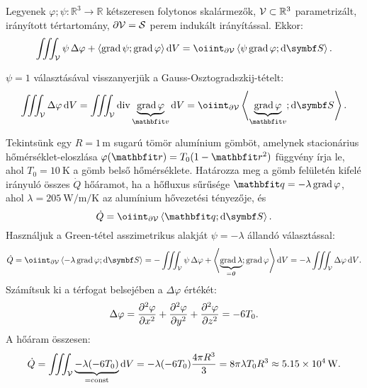 \documentclass{szb-practice}
\begin{document}
\begin{theorem}
  Legyenek $\varphi; \psi: \mathbb R^3 \rightarrow \mathbb R$ kétszeresen
  folytonos skalármezők, $\mathcal{V} \subset \mathbb R^3$ parametrizált,
  irányított tértartomány, $\partial \mathcal{V} = \mathcal{S}$ perem indukált
  irányítással. Ekkor:
  $$
    \iiint_{\volimage}
    \psi \, \Delta \varphi +
    \scalar{\grad \psi}{\grad \varphi}
    \dd \volscalar
    =
    \oiint_{\partial \volimage} \scalar{\psi \grad \varphi}{\dd \surfvec}
    \text.
  $$
\end{theorem}

\begin{note}
  $\psi = 1$ választásával visszanyerjük a Gauss-Osztogradszkij-tételt:
  $$
    \iiint_{\volimage} \Delta \varphi \dd \volscalar
    = \iiint_{\volimage} \Div \underbrace{\grad \varphi}_{\rvec v} \dd \volscalar
    = \oiint_{\partial \volimage} \scalar{\underbrace{\grad \varphi}_{\rvec v}}{\dd \surfvec}
    \text.
  $$
\end{note}

\begin{example}
  Tekintsünk egy $R = 1\,\text{m}$ sugarú tömör alumínium gömböt, amelynek
  stacionárius hőmér\-sék\-let-eloszlása $\varphi(\coordv) = T_0 (1 - \rvec r^2)$
  függvény írja le, ahol $T_0 = \SI{10}{\kelvin}$ a gömb belső hőmérséklete.
  Határozza meg a gömb felületén kifelé irányuló összes  $\dot Q$ hőáramot,
  ha a hőfluxus sűrűsége $\rvec q = -\lambda \grad \varphi$, ahol
  $\lambda = \SI[per-mode=symbol]{205}{\watt\per\meter\per\kelvin}$ az
  alumínium hővezetési tényezője, és
  $$
    \dot Q = \oiint_{\partial \volimage} \scalar{\rvec q}{\dd \surfvec}
    \text.
  $$
  Használjuk a Green-tétel asszimetrikus alakját $\psi = -\lambda$ állandó
  választással:
  $$
    \dot Q
    = \oiint_{\partial \volimage} \scalar{-\lambda \grad \varphi}{\dd \surfvec}
    = - \iiint_{\volimage} \psi \, \Delta \varphi + \scalar{\underbrace{\grad \lambda}_{= \nvec}}{\grad \varphi} \dd \volscalar
    = -\lambda \iiint_{\volimage} \Delta \varphi \dd \volscalar
    \text.
  $$
  Számítsuk ki a térfogat belsejében a $\Delta \varphi$ értékét:
  $$
    \Delta \varphi
    =\pdv[order=2]{\varphi}{x} + \pdv[order=2]{\varphi}{y} + \pdv[order=2]{\varphi}{z}
    = -6 T_0
    \text.
  $$
  A hőáram összesen:
  $$
    \dot Q = \iiint_{\mathcal{V}} \underbrace{-\lambda (-6 T_0)}_{=\text{const}} \mathop{}\!\mathrm{d} V
    = -\lambda (-6 T_0) \frac{4\pi R^3}{3}
    = 8 \pi \lambda T_0 R^3
    \approx \SI{5,15e4}{\watt}
    \text.
  $$
\end{example}
\end{document}

